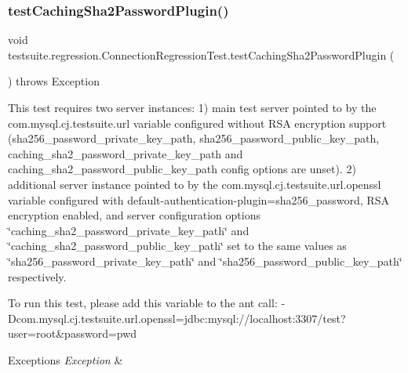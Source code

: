 \subsubsection{\texorpdfstring{test\+Caching\+Sha2\+Password\+Plugin()}{testCachingSha2PasswordPlugin()}}
{\footnotesize\ttfamily void testsuite.\+regression.\+Connection\+Regression\+Test.\+test\+Caching\+Sha2\+Password\+Plugin (\begin{DoxyParamCaption}{ }\end{DoxyParamCaption}) throws Exception}

This test requires two server instances\+: 1) main test server pointed to by the com.\+mysql.\+cj.\+testsuite.\+url variable configured without R\+SA encryption support (sha256\+\_\+password\+\_\+private\+\_\+key\+\_\+path, sha256\+\_\+password\+\_\+public\+\_\+key\+\_\+path, caching\+\_\+sha2\+\_\+password\+\_\+private\+\_\+key\+\_\+path and caching\+\_\+sha2\+\_\+password\+\_\+public\+\_\+key\+\_\+path config options are unset). 2) additional server instance pointed to by the com.\+mysql.\+cj.\+testsuite.\+url.\+openssl variable configured with default-\/authentication-\/plugin=sha256\+\_\+password, R\+SA encryption enabled, and server configuration options \char`\"{}caching\+\_\+sha2\+\_\+password\+\_\+private\+\_\+key\+\_\+path\char`\"{} and \char`\"{}caching\+\_\+sha2\+\_\+password\+\_\+public\+\_\+key\+\_\+path\char`\"{} set to the same values as \char`\"{}sha256\+\_\+password\+\_\+private\+\_\+key\+\_\+path\char`\"{} and \char`\"{}sha256\+\_\+password\+\_\+public\+\_\+key\+\_\+path\char`\"{} respectively.

To run this test, please add this variable to the ant call\+: -\/\+Dcom.\+mysql.\+cj.\+testsuite.\+url.\+openssl=jdbc\+:mysql\+://localhost\+:3307/test?user=root\&password=pwd


\begin{DoxyExceptions}{Exceptions}
{\em Exception} & \\
\hline
\end{DoxyExceptions}
\mbox{\label{classtestsuite_1_1regression_1_1_connection_regression_test_ad6b91c4ebbce888feac8a193ffb16a9d}} 
